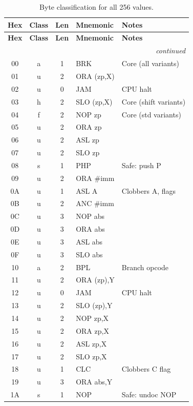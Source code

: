 \documentclass{article}
\begin{document}
{\small
\begin{longtable}{@{}ccclp{4.8cm}@{}}
\caption{Byte classification for all 256 values.}
\label{tab:bytes} \\
\toprule
\textbf{Hex} & \textbf{Class} & \textbf{Len} & \textbf{Mnemonic} &
\textbf{Notes} \\
\midrule
\endfirsthead
\toprule
\textbf{Hex} & \textbf{Class} & \textbf{Len} & \textbf{Mnemonic} &
\textbf{Notes} \\
\midrule
\endhead
\midrule
\multicolumn{5}{r}{\emph{continued}} \\
\endfoot
\bottomrule
\endlastfoot
00 & a  & 1 & BRK & Core (all variants) \\
01 & u  & 2 & ORA (zp,X) & \\
02 & u  & 0 & JAM & CPU halt \\
03 & h  & 2 & SLO (zp,X) & Core (shift variants) \\
04 & f  & 2 & NOP zp & Core (std variants) \\
05 & u  & 2 & ORA zp & \\
06 & u  & 2 & ASL zp & \\
07 & u  & 2 & SLO zp & \\
08 & s  & 1 & PHP & Safe: push P \\
09 & u  & 2 & ORA \#imm & \\
0A & u  & 1 & ASL A & Clobbers A, flags \\
0B & u  & 2 & ANC \#imm & \\
0C & u  & 3 & NOP abs & \\
0D & u  & 3 & ORA abs & \\
0E & u  & 3 & ASL abs & \\
0F & u  & 3 & SLO abs & \\
10 & a  & 2 & BPL & Branch opcode \\
11 & u  & 2 & ORA (zp),Y & \\
12 & u  & 0 & JAM & CPU halt \\
13 & u  & 2 & SLO (zp),Y & \\
14 & u  & 2 & NOP zp,X & \\
15 & u  & 2 & ORA zp,X & \\
16 & u  & 2 & ASL zp,X & \\
17 & u  & 2 & SLO zp,X & \\
18 & u  & 1 & CLC & Clobbers C flag \\
19 & u  & 3 & ORA abs,Y & \\
1A & s  & 1 & NOP & Safe: undoc NOP \\

\end{longtable}}
\end{document}
